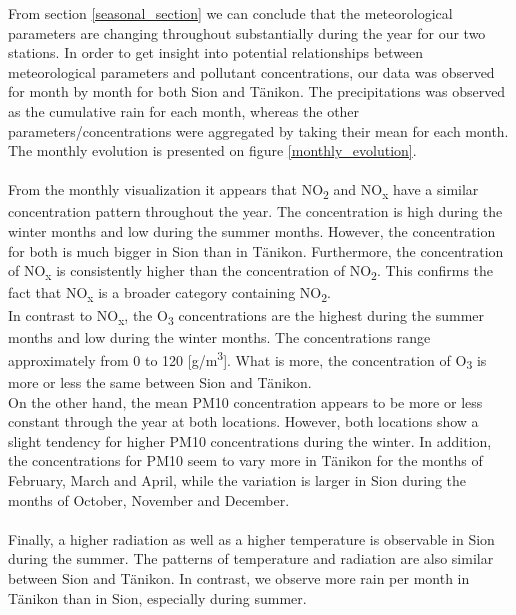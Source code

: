 \documentclass[a4paper, 12pt]{article}
\begin{document}
    From section \ref{seasonal_section} we can conclude that the meteorological parameters are changing throughout substantially during the year for our two stations. In order to get insight into potential relationships between meteorological parameters and pollutant concentrations, our data was observed for month by month for both Sion and Tänikon. The precipitations was observed as the cumulative rain for each month, whereas the other parameters/concentrations were aggregated by taking their mean for each month. The monthly evolution is presented on figure \ref{monthly_evolution}. 
    \\
    \\
    From the monthly visualization it appears that NO\textsubscript{2} and NO\textsubscript{x} have a similar concentration pattern throughout the year. The concentration is high during the winter months and low during the summer months. However, the concentration for both is much bigger in Sion than in Tänikon. Furthermore, the concentration of NO\textsubscript{x} is consistently higher than the concentration of NO\textsubscript{2}. This confirms the fact that NO\textsubscript{x} is a broader category containing NO\textsubscript{2}. 
    \\
    In contrast to NO\textsubscript{x}, the O\textsubscript{3} concentrations are the highest during the summer months and low during the winter months. The concentrations range approximately from 0 to 120 [\textmu g/m\textsuperscript{3}]. What is more, the concentration of O\textsubscript{3} is more or less the same between Sion and Tänikon. 
    \\
    On the other hand, the mean PM10 concentration appears to be more or less constant through the year at both locations. However, both locations show a slight tendency for higher PM10 concentrations during the winter. In addition, the concentrations for PM10 seem to vary more in Tänikon for the months of February, March and April, while the variation is larger in Sion during the months of October, November and December. 
    \\
    \\
    Finally, a higher radiation as well as a higher temperature is observable in Sion during the summer. The patterns of temperature and radiation are also similar between Sion and Tänikon. In contrast, we observe more rain per month in Tänikon than in Sion, especially during summer.
    \\
    
\end{document}
